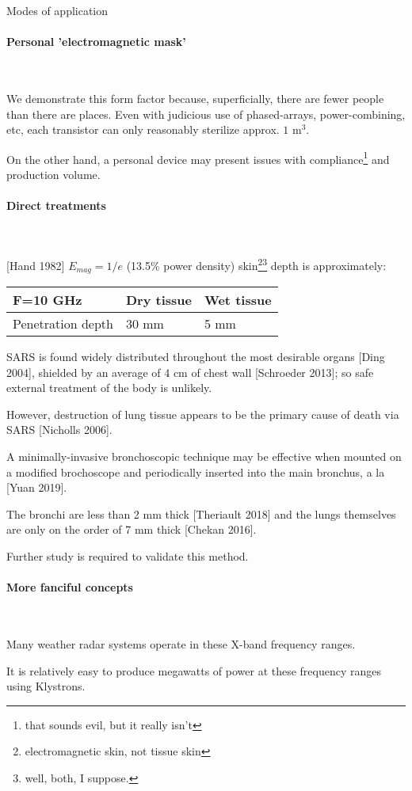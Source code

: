 \documentclass[fleqn,10pt]{article}
\begin{document}
\clearpage
\begin{multicols}{1}
{\Large Modes of application}\\

\paragraph{\textbf{Personal 'electromagnetic mask'}}\

We demonstrate this form factor because, superficially, there are fewer people than there are places. Even with judicious use of phased-arrays, power-combining, etc, each transistor can only reasonably sterilize approx. $ 1 \text{ m}^3 $.

On the other hand, a personal device may present issues with compliance\footnote{that sounds evil, but it really isn't} and production volume.

\paragraph{\textbf{Direct treatments}}\

[Hand 1982] $E_{mag}=1/e$ (13.5\% power density) skin\footnote{electromagnetic skin, not tissue skin}\footnote{well, both, I suppose.} depth is approximately:

\begin{center}
\begin{tabular}{|l|l|l|}
\hline
F=10 GHz          & Dry tissue & Wet tissue \\ \hline
Penetration depth & 30 mm      & 5 mm \\ \hline
\end{tabular}
\end{center}

SARS is found widely distributed throughout the most desirable organs [Ding 2004], shielded by an average of 4 cm of chest wall [Schroeder 2013]; so safe external treatment of the body is unlikely. 

However, destruction of lung tissue appears to be the primary cause of death via SARS [Nicholls 2006]. 

A minimally-invasive bronchoscopic technique may be effective when mounted on a modified brochoscope and periodically inserted into the main bronchus, a la [Yuan 2019].

The bronchi are less than 2 mm thick [Theriault 2018] and the lungs themselves are only on the order of 
7 mm thick [Chekan 2016].

Further study is required to validate this method.

\paragraph{\textbf{More fanciful concepts}}\

Many weather radar systems operate in these X-band frequency ranges. 

It is relatively easy to produce megawatts of power at these frequency ranges using Klystrons.



\end{multicols}
\end{document}
